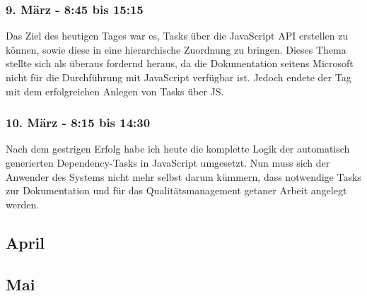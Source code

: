 \subsubsection*{9. März - 8:45 bis 15:15}
Das Ziel des heutigen Tages war es, Tasks über die JavaScript API erstellen zu können, sowie diese in eine hierarchische Zuordnung zu bringen. Dieses Thema stellte sich als überaus fordernd heraus, da die Dokumentation seitens Microsoft nicht für die Durchführung mit JavaScript verfügbar ist. Jedoch endete der Tag mit dem erfolgreichen Anlegen von Tasks über JS.

\subsubsection*{10. März - 8:15 bis 14:30}
Nach dem gestrigen Erfolg habe ich heute die komplette Logik der automatisch generierten Dependency-Tasks in JavaScript umgesetzt. Nun muss sich der Anwender des Systems nicht mehr selbst darum kümmern, dass notwendige Tasks zur Dokumentation und für das Qualitätsmanagement getaner Arbeit angelegt werden.

\subsection{April}

\subsection{Mai}
